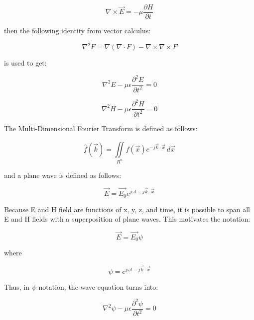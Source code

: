 \documentclass[12pt]{article}
\begin{document}
\begin{equation}
	\nabla \times \vec{E} = -\mu\frac{\partial H}{\partial t}
\end{equation}

then the following identity from vector calculus:

\begin{equation}
	\nabla^2F = \nabla(\nabla \cdot F) - \nabla\times\nabla\times F
\end{equation}

is used to get:

\begin{equation}
	\nabla^2E - \mu\epsilon\frac{\partial^2 E}{\partial t^2} = 0
\end{equation}

\begin{equation}
	\nabla^2H - \mu\epsilon\frac{\partial^2 H}{\partial t^2} = 0
\end{equation}

The Multi-Dimensional Fourier Transform is defined as follows:

\begin{equation}
	\hat{f} (\vec{k}) = \iint \limits_{R^n}^{} f(\vec{x})e^{-j \vec{k} \cdot \vec{x}} \,d\vec{x}
\end{equation}

and a plane wave is defined as follows:

\begin{equation}
	\vec{E} = \vec{E_{0}}e^{j \omega t - j\vec{k} \cdot \vec{x}}
\end{equation}

Because E and H field are functions of x, y, z, and time, it is possible to span all E and H fields with a superposition of plane waves. This motivates the notation:

\begin{equation}
	\vec{E} = \vec{E_{0}}\psi
\end{equation}

where

\begin{equation}
	\psi = e^{j \omega t - j\vec{k} \cdot \vec{x}}
\end{equation}

Thus, in \(\psi\) notation, the wave equation turns into:

\begin{equation}
	\nabla^2\psi - \mu\epsilon\frac{\partial^2\psi}{\partial t^2} = 0
\end{equation}
\end{document}
